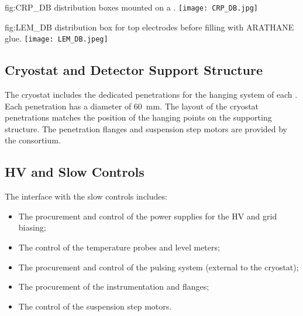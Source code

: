 \begin{dunefigure}
{fig:CRP_DB} 
{  distribution boxes mounted on a . }
  \texttt{[image: CRP\_DB.jpg]}
\end{dunefigure}


\begin{dunefigure}
{fig:LEM_DB} 
{ distribution box for  top electrodes before filling with ARATHANE glue. }
  \texttt{[image: LEM\_DB.jpeg]}
\end{dunefigure}


\subsection{Cryostat and Detector Support Structure}
\label{sec:fddp-crp-intfc-support}

The cryostat includes the dedicated penetrations for the hanging system of each . Each penetration has a diameter of \SI{60}{mm}. The layout of the cryostat penetrations   matches the position of the hanging points on the  supporting structure. The penetration flanges and  suspension step motors are provided by the  consortium.

\subsection{HV and Slow Controls}
\label{sec:fddp-crp-intfc-HV-slowcontrol}

The interface with the slow controls includes:

\begin{itemize}
\item The procurement and control of the power supplies for the HV and grid  biasing;
\item The control of the  temperature probes and level meters;
\item The procurement and control of the  pulsing system (external to the cryostat);
\item The procurement of the instrumentation and  \fdth flanges;
\item The control of the  suspension step motors.
\end{itemize}

